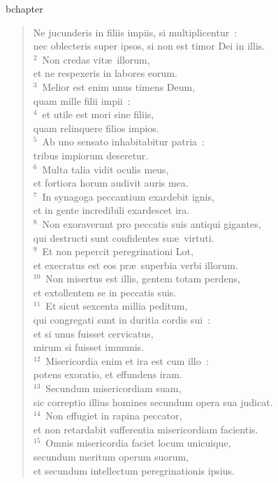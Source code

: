 bchapter\begin{verse}\vspace{-19pt}Ne jucunderis in filiis impiis, si multiplicentur~:\\ nec oblecteris super ipsos, si non est timor Dei in illis.\\
${}^{2}$~Non credas vit\ae\ illorum,\\ et ne respexeris in labores eorum.\\
${}^{3}$~Melior est enim unus timens Deum,\\ quam mille filii impii~:\\
${}^{4}$~et utile est mori sine filiis,\\ quam relinquere filios impios.\\
${}^{5}$~Ab uno sensato inhabitabitur patria~:\\ tribus impiorum deseretur.\\
${}^{6}$~Multa talia vidit oculis meus,\\ et fortiora horum audivit auris mea.\\
${}^{7}$~In synagoga peccantium exardebit ignis,\\ et in gente incredibili exardescet ira.\\
${}^{8}$~Non exoraverunt pro peccatis suis antiqui gigantes,\\ qui destructi sunt confidentes su\ae\ virtuti.\\
${}^{9}$~Et non pepercit peregrinationi Lot,\\ et execratus est eos pr\ae\ superbia verbi illorum.\\
${}^{10}$~Non misertus est illis, gentem totam perdens,\\ et extollentem se in peccatis suis.\\
${}^{11}$~Et sicut sexcenta millia peditum,\\ qui congregati sunt in duritia cordis sui~:\\ et si unus fuisset cervicatus,\\ mirum si fuisset immunis.\\
${}^{12}$~Misericordia enim et ira est cum illo~:\\ potens exoratio, et effundens iram.\\
${}^{13}$~Secundum misericordiam suam,\\ sic correptio illius homines secundum opera sua judicat.\\
${}^{14}$~Non effugiet in rapina peccator,\\ et non retardabit sufferentia misericordiam facientis.\\
${}^{15}$~Omnis misericordia faciet locum unicuique,\\ secundum meritum operum suorum,\\ et secundum intellectum peregrinationis ipsius.\end{verse}


